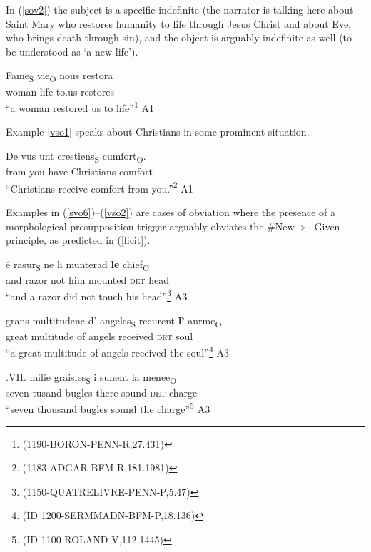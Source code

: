 \documentclass[output=paper,modfonts,nonflat]{langsci/langscibook}
\begin{document}
In (\ref{sov2}) the subject is a specific indefinite (the narrator is talking here about Saint Mary who restores humanity to life through Jesus Christ and about Eve, who brings death through sin), and the object is arguably indefinite as well (to be understood as `a new life').

\ea
\gll Fame\textsubscript{S} vie\textsubscript{O} nous restora\\
woman life to.us restores\\
\glt ``a woman restored us to life''\footnote{{(1190-BORON-PENN-R,27.431)}}\label{sov2} \hfill A1
\z

Example \ref{vso1} speaks about Christians in some prominent situation.

\ea
\gll De vus unt crestiens\textsubscript{S} cumfort\textsubscript{O}.\\
from you have Christians comfort\\
\glt ``Christians receive comfort from you.''\footnote{{(1183-ADGAR-BFM-R,181.1981)}}\label{vso1} \hfill A1
\z

Examples in (\ref{svo6})--(\ref{vso2}) are cases of obviation where the presence of a morphological presupposition trigger arguably obviates the \#New $\succ$ Given principle, as predicted in (\ref{licit}).

\ea
\gll \'{e} rasur\textsubscript{S} ne li munterad {\bfseries le} chief\textsubscript{O}\\
and razor not him mounted {\scshape det} head\\
\glt ``and a razor did not touch his head''\footnote{{(1150-QUATRELIVRE-PENN-P,5.47)}}\label{svo6} \hfill A3
\z

\ea
\gll grans multitudene d' angeles\textsubscript{S} recurent {\bfseries l'} anrme\textsubscript{O}\\
great multitude of angels received {\scshape det} soul\\
\glt ``a great multitude of angels received the soul''\footnote{{(ID 1200-SERMMADN-BFM-P,18.136)}}\label{svo7} \hfill A3
\z



\ea 
\gll .VII. milie graisles\textsubscript{S} i sunent la menee\textsubscript{O}\\
seven tusand bugles there sound {\scshape det} charge\\ 
\glt ``seven thousand bugles sound the charge''\footnote{{(ID 1100-ROLAND-V,112.1445)}}\label{sov3}  \hfill A3
\z 
\end{document}
